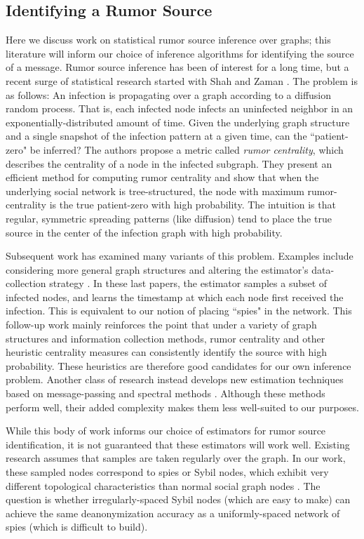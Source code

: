 \documentclass[10pt, twocolumn]{article}
\begin{document}
\subsection{Identifying a Rumor Source}
Here we discuss work on statistical rumor source inference over graphs; this literature will inform our choice of inference algorithms for identifying the source of a message.
Rumor source inference has been of interest for a long time, but a recent surge of statistical research started with Shah and Zaman \cite{shah2011rumors}. The problem is as follows: An infection is propagating over a graph according to a diffusion random process. 
That is, each infected node infects an uninfected neighbor in an exponentially-distributed amount of time.
Given the underlying graph structure and a single snapshot of the infection pattern at a given time, can the ``patient-zero" be inferred?
The authors propose a metric called \emph{rumor centrality}, which describes the centrality of a node in the infected subgraph.
They present an efficient method for computing rumor centrality and show that when the underlying social network is tree-structured, the node with maximum rumor-centrality is the true patient-zero with high probability. The intuition is that regular, symmetric spreading patterns (like diffusion) tend to place the true source in the center of the infection graph with high probability. 

Subsequent work has examined many variants of this problem. Examples include considering more general graph structures \cite{shah2012rumor} and altering the estimator's data-collection strategy \cite{pinto,karamchandani2013rumor,luo2013identify}.
In these last papers, the estimator samples a subset of infected nodes, and learns the timestamp at which each node first received the infection. 
This is equivalent to our notion of placing ``spies" in the network. 
This follow-up work mainly reinforces the point that under a variety of graph structures and information collection methods, rumor centrality and other heuristic centrality measures can consistently identify the source with high probability. 
These heuristics are therefore good candidates for our own inference problem. 
Another class of research instead develops new estimation techniques based on message-passing \cite{lokhov2014inferring} and spectral methods \cite{fioriti2012predicting}.
Although these methods perform well, their added complexity makes them less well-suited to our purposes.

While this body of work informs our choice of estimators for rumor source identification, it is not guaranteed that these estimators will work well. 
Existing research assumes that samples are taken regularly over the graph. 
In our work, these sampled nodes correspond to spies or Sybil nodes, which exhibit very different topological characteristics than normal social graph nodes \cite{narayanan2009anonymizing}.
The question is whether irregularly-spaced Sybil nodes (which are easy to make) can achieve the same deanonymization accuracy as a uniformly-spaced network of spies (which is difficult to build).



\end{document}
